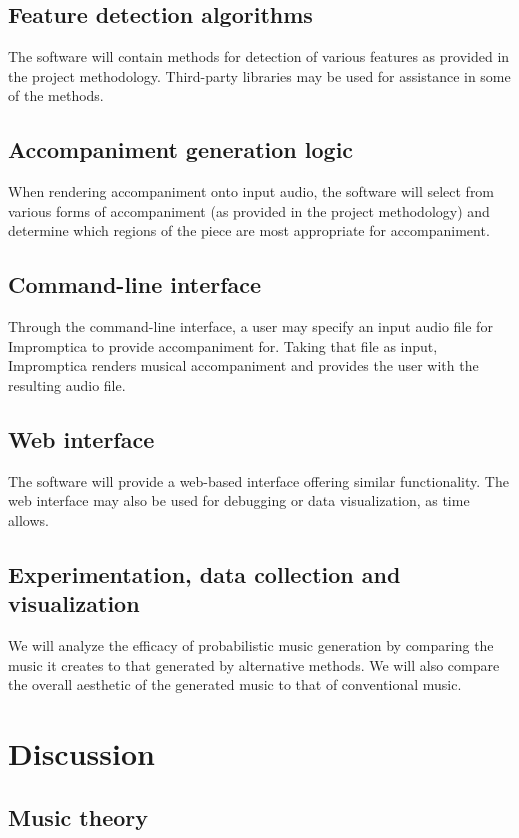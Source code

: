 \documentclass[11pt,conference,letterpaper]{IEEEtran}
\begin{document}
\subsection{Feature detection algorithms}

The software will contain methods for detection of various features as provided in the project methodology. Third-party libraries may be used for assistance in some of the methods.
\subsection{Accompaniment generation logic}

When rendering accompaniment onto input audio, the software will select from various forms of accompaniment (as provided in the project methodology) and determine which regions of the piece are most appropriate for accompaniment.
\subsection{Command-line interface}

Through the command-line interface, a user may specify an input audio file for Impromptica to provide accompaniment for. Taking that file as input, Impromptica renders musical accompaniment and provides the user with the resulting audio file.

\subsection{Web interface}
The software will provide a web-based interface offering similar functionality. The web interface may also be used for debugging or data visualization, as time allows.

\subsection{Experimentation, data collection and visualization}
We will analyze the efficacy of probabilistic music generation by comparing the music it creates to that generated by alternative methods.  We will also compare the overall aesthetic of the generated music to that of conventional music.

\section{Discussion}

\subsection {Music theory}
\end{document}
